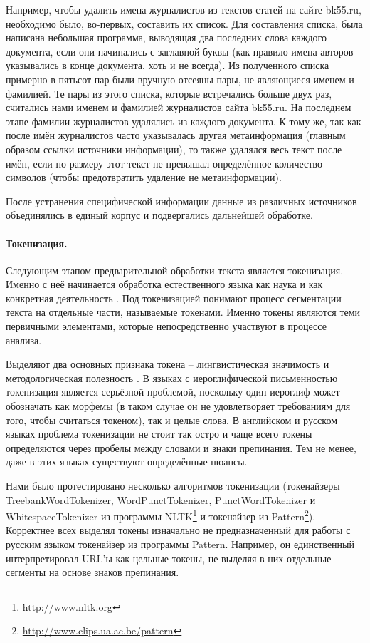 Например, чтобы удалить имена журналистов из текстов статей на сайте bk55.ru, необходимо было, во-первых, составить их список. Для составления списка, была написана небольшая программа, выводящая два последних слова каждого документа, если они начинались с заглавной буквы (как правило имена авторов указывались в конце документа, хоть и не всегда). Из полученного списка примерно в пятьсот пар были вручную отсеяны пары, не являющиеся именем и фамилией. Те пары из этого списка, которые встречались больше двух раз, считались нами именем и фамилией журналистов сайта bk55.ru. На последнем этапе фамилии журналистов удалялись из каждого документа. К тому же, так как после имён журналистов часто указывалась другая метаинформация (главным образом ссылки источники информации), то также удалялся весь текст после имён, если по размеру этот текст не превышал определённое количество символов (чтобы предотвратить удаление не метаинформации). 

После устранения специфической информации данные из различных источников объединялись в единый корпус и подвергались дальнейшей обработке.

\paragraph{Токенизация.}
Следующим этапом предварительной обработки текста является токенизация. Именно с неё начинается обработка естественного языка как наука и как конкретная деятельность \cite{Webster1992}. Под токенизацией понимают процесс сегментации текста на отдельные части, называемые токенами. Именно токены являются теми первичными элементами, которые непосредственно участвуют в процессе анализа. 

Выделяют два основных признака токена -- лингвистическая значимость и методологическая полезность \cite[стр. 1106]{Webster1992}. В языках с иероглифической письменностью токенизация является серьёзной проблемой, поскольку один иероглиф может обозначать как морфемы (в таком случае он не удовлетворяет требованиям для того, чтобы считаться токеном), так и целые слова. В английском и русском языках проблема токенизации не стоит так остро и чаще всего токены определяются через пробелы между словами и знаки препинания. Тем не менее, даже в этих языках существуют определённые нюансы.

Нами было протестировано несколько алгоритмов токенизации (токенайзеры TreebankWordTokenizer, WordPunctTokenizer, PunctWordTokenizer и WhitespaceTokenizer из программы NLTK\footnote{\href{http://www.nltk.org}{http://www.nltk.org}} и токенайзер из Pattern\footnote{\href{http://www.clips.ua.ac.be/pattern}{http://www.clips.ua.ac.be/pattern}}). Корректнее всех выделял токены изначально не предназначенный для работы с русским языком токенайзер из программы Pattern. Например, он единственный интерпретировал URL'ы как цельные токены, не выделяя в них отдельные сегменты на основе знаков препинания.

